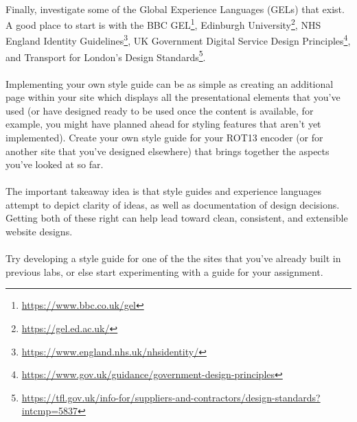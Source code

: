 \documentclass[10pt, a4paper]{article}
\begin{document}
\paragraph{} Finally, investigate some of the Global Experience Languages (GELs) that exist. A good place to start is with the BBC GEL\footnote{\url{https://www.bbc.co.uk/gel}}, Edinburgh University\footnote{\url{https://gel.ed.ac.uk/}}, NHS England Identity Guidelines\footnote{\url{https://www.england.nhs.uk/nhsidentity/}}, UK Government Digital Service Design Principles\footnote{\url{https://www.gov.uk/guidance/government-design-principles}}, and Transport for London's Design Standards\footnote{\url{https://tfl.gov.uk/info-for/suppliers-and-contractors/design-standards?intcmp=5837}}. \paragraph{} Implementing your own style guide can be as simple as creating an additional page within your site which displays all the presentational elements that you've used (or have designed ready to be used once the content is available, for example, you might have planned ahead for styling features that aren't yet implemented). Create your own style guide for your ROT13 encoder (or for another site that you've designed elsewhere) that brings together the aspects you've looked at so far.

\paragraph{} The important takeaway idea is that style guides and experience languages attempt to depict clarity of ideas, as well as documentation of design decisions. Getting both of these right can help lead toward clean, consistent, and extensible website designs.

\paragraph{} Try developing a style guide for one of the the sites that you've already built in previous labs, or else start experimenting with a guide for your assignment.
\end{document}
